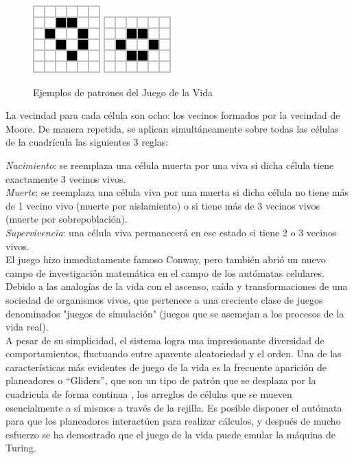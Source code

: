 \begin{figure}[H]
\centering
\includegraphics[scale=0.6]{imagenes/life_1.png}
\hspace{2cm}
\includegraphics[scale=0.6]{imagenes/life_2.png}
\caption{Ejemplos de patrones del Juego de la Vida}
\label{fig:patrones}
\end{figure}


La vecindad para cada célula son ocho: los vecinos formados por la vecindad de  Moore. De manera repetida, se aplican simultáneamente sobre todas las células de la cuadrícula las siguientes 3 reglas:

\textit{Nacimiento}: se reemplaza una célula muerta por una viva si dicha célula tiene exactamente 3 vecinos vivos.\\
\textit{Muerte}: se reemplaza una célula viva por una muerta si dicha célula no tiene más de 1 vecino vivo (muerte por aislamiento) o si tiene más de 3 vecinos vivos (muerte por sobrepoblación).\\
\textit{Supervivencia}: una célula viva permanecerá en ese estado si tiene 2 o 3 vecinos vivos.\\

El juego hizo inmediatamente famoso Conway, pero también abrió un nuevo campo de investigación matemática en el campo de los autómatas celulares. Debido a las analogías de la vida con el ascenso, caída y transformaciones de una sociedad de organismos vivos, que pertenece a una creciente clase de juegos denominados "juegos de simulación" (juegos que se asemejan a los procesos de la vida real).\\

A pesar de su simplicidad, el sistema logra una impresionante diversidad de comportamientos, fluctuando entre aparente aleatoriedad y el orden. Una de las características más evidentes de juego de la vida es la frecuente aparición de planeadores o ``Gliders'', que son un tipo de patrón que se desplaza por la cuadricula de forma continua , los arreglos de células que se mueven esencialmente a sí mismos a través de la rejilla. Es posible disponer el autómata para que los planeadores interactúen para realizar cálculos, y después de mucho esfuerzo se ha demostrado que el juego de la vida puede emular  la máquina de Turing.

